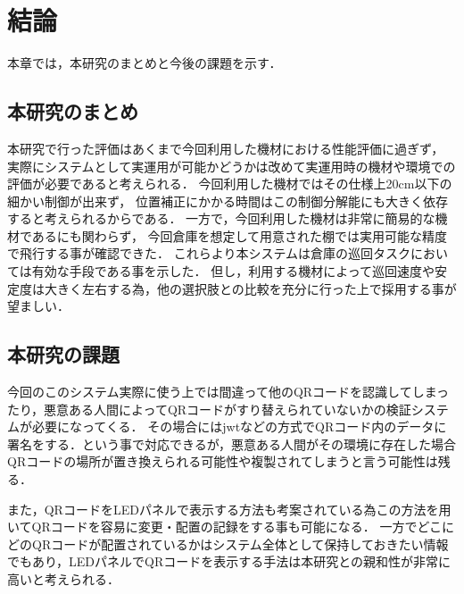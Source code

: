 \chapter{結論}
\label{conclusion}

本章では，本研究のまとめと今後の課題を示す．

\section{本研究のまとめ}
本研究で行った評価はあくまで今回利用した機材における性能評価に過ぎず，
実際にシステムとして実運用が可能かどうかは改めて実運用時の機材や環境での評価が必要であると考えられる．
今回利用した機材ではその仕様上20cm以下の細かい制御が出来ず，
位置補正にかかる時間はこの制御分解能にも大きく依存すると考えられるからである．
一方で，今回利用した機材は非常に簡易的な機材であるにも関わらず，
今回倉庫を想定して用意された棚では実用可能な精度で飛行する事が確認できた．
これらより本システムは倉庫の巡回タスクにおいては有効な手段である事を示した．
但し，利用する機材によって巡回速度や安定度は大きく左右する為，他の選択肢との比較を充分に行った上で採用する事が望ましい．


\section{本研究の課題}
今回のこのシステム実際に使う上では間違って他のQRコードを認識してしまったり，悪意ある人間によってQRコードがすり替えられていないかの検証システムが必要になってくる．
その場合にはjwtなどの方式でQRコード内のデータに署名をする．という事で対応できるが，悪意ある人間がその環境に存在した場合QRコードの場所が置き換えられる可能性や複製されてしまうと言う可能性は残る．

また，QRコードをLEDパネルで表示する方法\cite{led_qr}も考案されている為この方法を用いてQRコードを容易に変更・配置の記録をする事も可能になる．
一方でどこにどのQRコードが配置されているかはシステム全体として保持しておきたい情報でもあり，LEDパネルでQRコードを表示する手法は本研究との親和性が非常に高いと考えられる．

